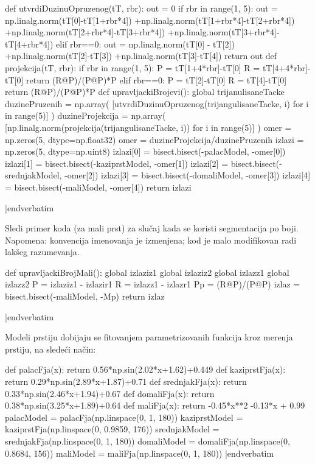 {\eightpoint
\verbatim


def utvrdiDuzinuOpruzenog(tT, rbr):
  out = 0
  if rbr in range(1, 5):
    out = np.linalg.norm(tT[0]-tT[1+rbr*4])
        +np.linalg.norm(tT[1+rbr*4]-tT[2+rbr*4])
        +np.linalg.norm(tT[2+rbr*4]-tT[3+rbr*4])
        +np.linalg.norm(tT[3+rbr*4]-tT[4+rbr*4])
  elif rbr==0:
    out = np.linalg.norm(tT[0] - tT[2])
        +np.linalg.norm(tT[2]-tT[3])
        +np.linalg.norm(tT[3]-tT[4])
  return out
def projekcija(tT, rbr):
  if rbr in range(1, 5):
    P = tT[1+4*rbr]-tT[0]
    R = tT[4+4*rbr]-tT[0]
    return (R@P)/(P@P)*P
  elif rbr==0:
    P = tT[2]-tT[0]
    R = tT[4]-tT[0]
    return (R@P)/(P@P)*P
def upravljackiBrojevi():
    global trijanulisaneTacke
    duzinePruzenih = np.array(
         [utvrdiDuzinuOpruzenog(trijangulisaneTacke, i) for i in range(5)]
    )
    duzineProjekcija = np.array(
        [np.linalg.norm(projekcija(trijangulisaneTacke, i)) for i in range(5)]
    )
    omer = np.zeros(5, dtype=np.float32)
    omer = duzineProjekcija/duzinePruzenih
    izlazi = np.zeros(5, dtype=np.uint8)
    izlazi[0] = bisect.bisect(-palacModel, -omer[0])
    izlazi[1] = bisect.bisect(-kaziprstModel, -omer[1])
    izlazi[2] = bisect.bisect(-srednjakModel, -omer[2])
    izlazi[3] = bisect.bisect(-domaliModel, -omer[3])
    izlazi[4] = bisect.bisect(-maliModel, -omer[4])
    return izlazi

|endverbatim
}

Sledi primer koda (za mali prst) za slu\v{c}aj kada se koristi segmentacija po boji.  Napomena: konvencija imenovanja je izmenjena; kod je malo modifikovan radi lak\v{s}eg razumevanja.

{\eightpoint
\verbatim



def upravljackiBrojMali():
    global izlaziz1
    global izlaziz2
    global izlazz1
    global izlazz2
    P = izlaziz1 - izlazir1
    R = izlazz1 - izlazr1
    Pp = (R@P)/(P@P)
    izlaz = bisect.bisect(-maliModel, -Mp)
    return izlaz

|endverbatim
}


Modeli prstiju dobijaju se fitovanjem parametrizovanih funkcija kroz merenja prstiju, na slede\'ci na\v{c}in:

{\eightpoint
\verbatim



def palacFja(x):
  return 0.56*np.sin(2.02*x+1.62)+0.449
def kaziprstFja(x):
  return 0.29*np.sin(2.89*x+1.87)+0.71
def srednjakFja(x):
  return 0.33*np.sin(2.46*x+1.94)+0.67
def domaliFja(x):
  return 0.38*np.sin(3.25*x+1.89)+0.64
def maliFja(x):
  return -0.45*x**2 -0.13*x + 0.99
palacModel = palacFja(np.linspace(0, 1, 180))
kaziprstModel = kaziprstFja(np.linspace(0, 0.9859, 176))
srednjakModel = srednjakFja(np.linspace(0, 1, 180))
domaliModel = domaliFja(np.linspace(0, 0.8684, 156))
maliModel = maliFja(np.linspace(0, 1, 180))
|endverbatim
}

